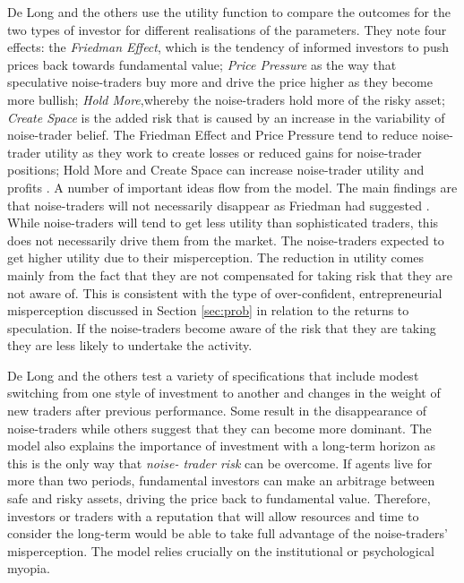 \documentclass[12pt, a4paper, oneside]{article} %
\begin{document}
De Long and the others use the utility function to compare the outcomes for the two types of investor for different realisations of the parameters.  They note four effects:  the \emph{Friedman Effect}, which is the tendency of informed investors to push prices back towards fundamental value; \emph{Price Pressure} as the way that speculative noise-traders buy more and drive the price higher as they become more bullish; \emph{Hold More},whereby the noise-traders hold more of the risky asset; \emph{Create Space} is the added risk that is caused by an increase in the variability of noise-trader belief.  The Friedman Effect and Price Pressure tend to reduce noise-trader utility as they work to create losses or reduced gains for noise-trader positions; Hold More and Create Space can increase noise-trader utility and profits \citep[pp. 14-15]{Delong1990noise}. 
A number of important ideas flow from the model.  The main findings are that noise-traders will not necessarily disappear as Friedman had suggested \citep{FriedmanPositive}.  While noise-traders will tend to get less utility than sophisticated traders, this does not necessarily drive them from the market.  The noise-traders expected to get higher utility due to their misperception.  The reduction in utility comes mainly from the fact that they are not compensated for taking risk that they are not aware of.  This is consistent with the type of over-confident, entrepreneurial misperception discussed in Section \ref{sec:prob} in relation to the returns to speculation.  If the noise-traders become aware of the risk that they are taking they are less likely to undertake the activity. 

De Long and the others test a variety of specifications that include modest switching from one style of investment to another and changes in the weight of new traders after previous performance.  Some result in the disappearance of noise-traders while others suggest that they can become more dominant.  The model also explains the importance of investment with a long-term horizon as this is the only way that \emph{noise- trader risk} can be overcome.  If agents live for more than two periods, fundamental investors can make an arbitrage between safe and risky assets, driving the price back to fundamental value.  Therefore, investors or traders with a reputation that will allow resources and time to consider the long-term would be able to take full advantage of the noise-traders' misperception.  The model relies crucially on the institutional or psychological myopia. 
\end{document}
